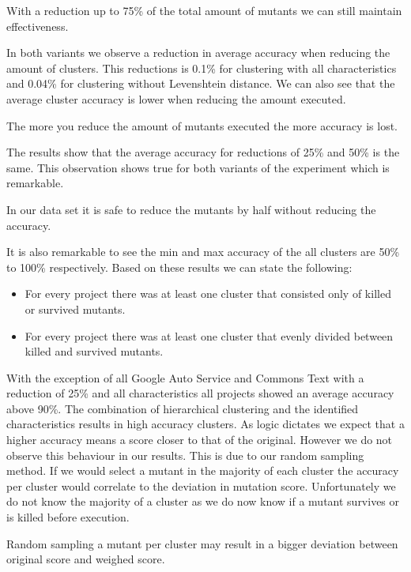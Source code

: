 \documentclass[../main]{subfiles}
\begin{document}
\begin{finding}
    With a reduction up to 75\% of the total amount of mutants we can still maintain effectiveness.
\end{finding}
In both variants we observe a reduction in average accuracy when reducing the amount of clusters.
This reductions is 0.1\% for clustering with all characteristics and 0.04\% for clustering without Levenshtein distance.
We can also see that the average cluster accuracy is lower when reducing the amount executed.
\begin{finding}
    The more you reduce the amount of mutants executed the more accuracy is lost.
\end{finding}
The results show that the average accuracy for reductions of 25\% and 50\% is the same.
This observation shows true for both variants of the experiment which is remarkable.
\begin{finding}
    In our data set it is safe to reduce the mutants by half without reducing the accuracy.
\end{finding}
It is also remarkable to see the min and max accuracy of the all clusters are 50\% to 100\% respectively.
Based on these results we can state the following:
\begin{itemize}
    \item For every project there was at least one cluster that consisted only of killed or survived mutants.
    \item For every project there was at least one cluster that evenly divided between killed and survived mutants.
\end{itemize}
With the exception of all Google Auto Service and Commons Text with a reduction of 25\% and all characteristics all projects showed an average accuracy above 90\%.
The combination of hierarchical clustering and the identified characteristics results in high accuracy clusters.
As logic dictates we expect that a higher accuracy means a score closer to that of the original.
However we do not observe this behaviour in our results.
This is due to our random sampling method.
If we would select a mutant in the majority of each cluster the accuracy per cluster would correlate to the deviation in mutation score.
Unfortunately we do not know the majority of a cluster as we do now know if a mutant survives or is killed before execution.
\begin{finding}
    Random sampling a mutant per cluster may result in a bigger deviation between original score and weighed score.
\end{finding}
\end{document}
